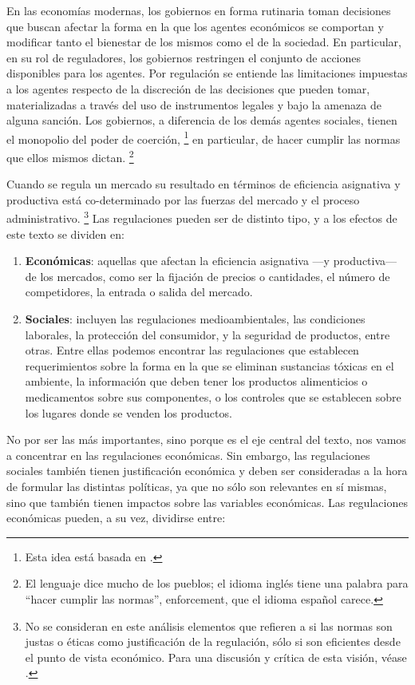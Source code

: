 \documentclass[
  12pt,
  spanish,
]{book}
\begin{document}
En las economías modernas, los gobiernos en forma rutinaria toman
decisiones que buscan afectar la forma en la que los agentes económicos
se comportan y modificar tanto el bienestar de los mismos como el de la
sociedad. En particular, en su rol de reguladores, los gobiernos
restringen el conjunto de acciones disponibles para los agentes. Por
regulación se entiende las limitaciones impuestas a los agentes respecto
de la discreción de las decisiones que pueden tomar, materializadas a
través del uso de instrumentos legales y bajo la amenaza de alguna
sanción. Los gobiernos, a diferencia de los demás agentes sociales,
tienen el monopolio del poder de coerción, \footnote{Esta idea está
  basada en \citep{Weber1921}.} en particular, de hacer cumplir las
normas que ellos mismos dictan. \footnote{El lenguaje dice mucho de los
  pueblos; el idioma inglés tiene una palabra para ``hacer cumplir las
  normas'', enforcement, que el idioma español carece.}

Cuando se regula un mercado su resultado en términos de eficiencia
asignativa y productiva está co-determinado por las fuerzas del mercado
y el proceso administrativo. \footnote{No se consideran en este análisis
  elementos que refieren a si las normas son justas o éticas como
  justificación de la regulación, sólo si son eficientes desde el punto
  de vista económico. Para una discusión y crítica de esta visión, véase
  \citep[capítulo 3]{Baldwin2011}.} Las regulaciones pueden ser de
distinto tipo, y a los efectos de este texto se dividen en:

\begin{enumerate}
\def\labelenumi{\arabic{enumi}.}
\item
  \textbf{Económicas}: aquellas que afectan la eficiencia asignativa
  ---y productiva--- de los mercados, como ser la fijación de precios o
  cantidades, el número de competidores, la entrada o salida del
  mercado.
\item
  \textbf{Sociales}: incluyen las regulaciones medioambientales, las
  condiciones laborales, la protección del consumidor, y la seguridad de
  productos, entre otras. Entre ellas podemos encontrar las regulaciones
  que establecen requerimientos sobre la forma en la que se eliminan
  sustancias tóxicas en el ambiente, la información que deben tener los
  productos alimenticios o medicamentos sobre sus componentes, o los
  controles que se establecen sobre los lugares donde se venden los
  productos.
\end{enumerate}

No por ser las más importantes, sino porque es el eje central del texto,
nos vamos a concentrar en las regulaciones económicas. Sin embargo, las
regulaciones sociales también tienen justificación económica y deben ser
consideradas a la hora de formular las distintas políticas, ya que no
sólo son relevantes en sí mismas, sino que también tienen impactos sobre
las variables económicas. Las regulaciones económicas pueden, a su vez,
dividirse entre:
\end{document}
